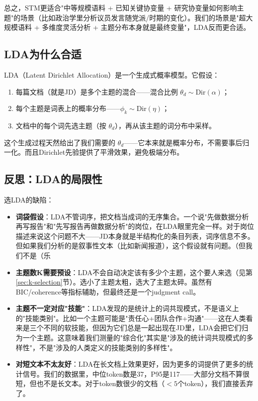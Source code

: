 \documentclass[12pt,a4paper]{ctexart}
\begin{document}
总之，STM更适合"中等规模语料 + 已知关键协变量 + 研究协变量如何影响主题"的场景（比如政治学里分析议员发言随党派/时期的变化）。我们的场景是"超大规模语料 + 多维度灵活分析 + 主题分布本身就是最终变量"，LDA反而更合适。

\subsection{LDA为什么合适}

LDA（Latent Dirichlet Allocation）是一个生成式概率模型。它假设：

\begin{enumerate}
\item 每篇文档（就是JD）是多个主题的混合——混合比例 $\theta_d \sim \text{Dir}(\alpha)$；
\item 每个主题是词表上的概率分布——$\phi_k \sim \text{Dir}(\eta)$；
\item 文档中的每个词先选主题（按 $\theta_d$），再从该主题的词分布中采样。
\end{enumerate}

这个生成过程天然给出了我们需要的 $\theta_d$——它本来就是概率分布，不需要事后归一化。而且Dirichlet先验提供了平滑效果，避免极端分布。

\subsection{反思：LDA的局限性}

选LDA的缺陷：

\begin{itemize}
\item \textbf{词袋假设}：LDA不管词序，把文档当成词的无序集合。一个说"先做数据分析再写报告"和"先写报告再做数据分析"的岗位，在LDA眼里完全一样。对于岗位描述来说这个问题不大——JD本身就是半结构化的条目列表，词序信息不多。但如果我们分析的是叙事性文本（比如新闻报道），这个假设就有问题。（但我们不是（乐
\item \textbf{主题数K需要预设}：LDA不会自动决定该有多少个主题，这个要人来选（见第\ref{sec:k-selection}节）。选小了主题太粗，选大了主题太碎。虽然有BIC/coherence等指标辅助，但最终还是一个judgment call。
\item \textbf{主题不一定对应"技能"}：LDA发现的是统计上的词共现模式，不是语义上的"技能类别"。比如一个主题可能是"责任心+团队合作+沟通"——这在人类看来是三个不同的软技能，但因为它们总是一起出现在JD里，LDA会把它们归为一个主题。这意味着我们测量的"综合化"其实是"涉及的统计词共现模式的多样性"，不是"涉及的人类定义的技能类别的多样性"。
\item \textbf{对短文本不太友好}：LDA在长文档上效果更好，因为更多的词提供了更多的统计信号。我们的数据里，中位token数是37，P95是117——大部分文档不算很短，但也不是长文本。对于token数很少的文档（$<5$个token），我们直接丢弃了。
\end{itemize}
\end{document}
